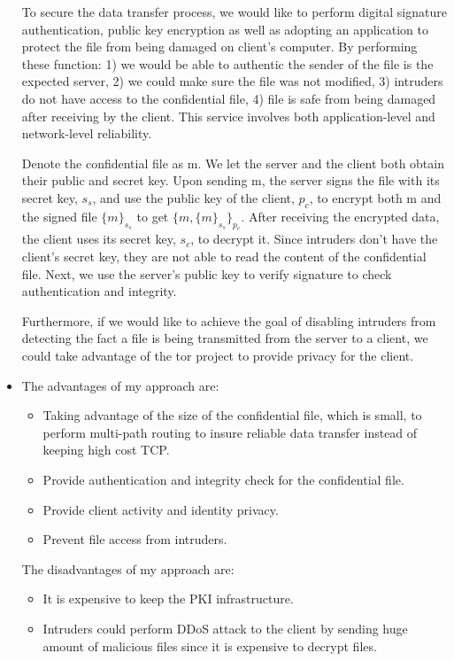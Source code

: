 \begin{itemize}
To secure the data transfer process, we would like to perform digital signature authentication, public key encryption as well as adopting an application to protect the file from being damaged on client's computer. By performing these function: 1) we would be able to authentic the sender of the file is the expected server, 2) we could make sure the file was not modified, 3) intruders do not have access to the confidential file, 4) file is safe from being damaged after receiving by the client. This service involves both application-level and network-level reliability.

Denote the confidential file as m. We let the server and the client both obtain their public and secret key. Upon sending m, the server signs the file with its secret key, $s_s$, and use the public key of the client, $p_c$, to encrypt both m and the signed file $\{m\}_{s_s}$ to get $\{m, \{m\}_{s_s}\}_{p_c}$. After receiving the encrypted data, the client uses its secret key, $s_c$, to decrypt it. Since intruders don't have the client's secret key, they are not able to read the content of the confidential file. Next, we use the server's  public key to verify signature to check authentication and integrity.

Furthermore, if we would like to achieve the goal of disabling intruders from detecting the fact a file is being transmitted from the server to a client, we could take advantage of the tor project to provide privacy for the client.

\item The advantages of my approach are:
\begin{itemize}
\item Taking advantage of the size of the confidential file, which is small, to perform multi-path routing to insure reliable data transfer instead of keeping high cost TCP.
\item Provide authentication and integrity check for the confidential file.
\item Provide client activity and identity privacy.
\item Prevent file access from intruders.
\end{itemize}

The disadvantages of my approach are:
\begin{itemize}
\item It is expensive to keep the PKI infrastructure.
\item Intruders could perform DDoS attack to the client by sending huge amount of malicious files since it is expensive to decrypt files.
\end{itemize}

\end{itemize}



